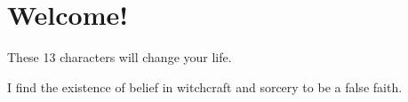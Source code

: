 
\setcounter{footnote}{0}
\setcounter{endnote}{0}

\chapter*{Welcome!}
\par These 13 characters will change your life.
\par I find the existence of belief in witchcraft and sorcery to be a false faith.

\theendnotes